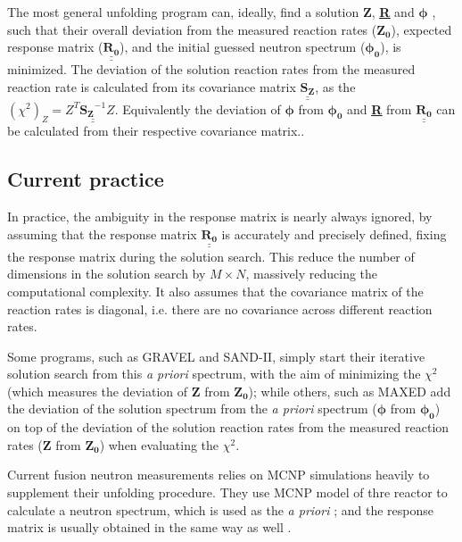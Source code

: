 \documentclass[a4paper, 12pt]{article}
\newcommand{\matr}[1]{\underline{\underline{\textbf{#1}}}}
\newcommand{\ve}[1]{\boldsymbol{#1}}
\begin{document}
The most general unfolding program can, ideally, find a solution $\ve{Z}$, \matr{R} and $\ve{\phi}$ \cite{theorypdf}, such that their overall deviation from the measured reaction rates ($\ve{Z_0}$), expected response matrix ($\underline{\underline{\mathbf{R_0}}}$), and the initial guessed neutron spectrum ($\ve{\phi_0}$), is minimized. The deviation of the solution reaction rates from the measured reaction rate is calculated from its covariance matrix $\underline{\underline{\mathbf{S_Z}}}$, as the $(\chi^2)_Z = Z^T \underline{\underline{\mathbf{S_Z}^{-1}}} Z$. Equivalently the deviation of $\ve{\phi}$ from $\ve{\phi_0}$ and \matr{R} from $\underline{\underline{\mathbf{R_0}}}$ can be calculated from their respective covariance matrix..

\subsection{Current practice}
In practice, the ambiguity in the response matrix is nearly always ignored, by assuming that the response matrix $\underline{\underline{\mathbf{R_0}}}$ is accurately and precisely defined, fixing the response matrix during the solution search. This reduce the number of dimensions in the solution search by $M\times N$, massively reducing the computational complexity. It also assumes that the covariance matrix of the reaction rates is diagonal, i.e. there are no covariance across different reaction rates.

Some programs, such as GRAVEL\cite{ManfredMatzkeHEPRO} and SAND-II\cite{SAND-II}, simply start their iterative solution search from this \emph{a priori} spectrum, with the aim of minimizing the $\chi^2$ (which measures the deviation of $\ve{Z}$ from $\ve{Z_0}$); while others, such as MAXED \cite{MAXED1998Reginatto} add the deviation of the solution spectrum from the \emph{a priori} spectrum ($\ve{\phi}$ from $\ve{\phi_0}$) on top of the deviation of the solution reaction rates from the measured reaction rates ($\ve{Z}$ from $\ve{Z_0}$) when evaluating the $\chi^2$.

Current fusion neutron measurements relies on MCNP simulations heavily to supplement their unfolding procedure. They use MCNP model of thre reactor to calculate a neutron spectrum, which is used as the \emph{a priori} \cite{MatzkeUnfoldingProcedure} \cite{InternalReportOnDeliverables_LWP}; and the response matrix is usually obtained in the same way as well \cite{bethColling_TBMD}.
\end{document}
